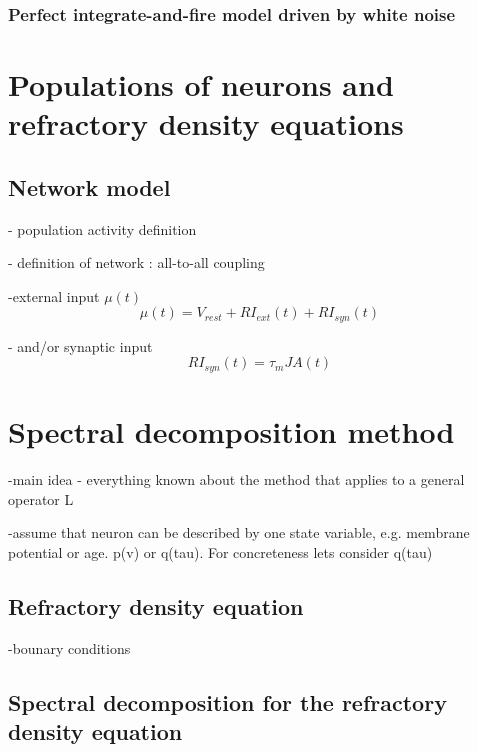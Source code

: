 \documentclass{report}
\begin{document}
\subsubsection{Perfect integrate-and-fire model driven by white noise}
\label{sec:pif}



\section{Populations of neurons and refractory density equations}


\subsection{Network model}


- population activity definition

- definition of network : all-to-all coupling

-external input $\mu(t)$
\begin{equation}
  \mu(t)=V_{rest}+RI_{ext}(t)+RI_{syn}(t)
\end{equation}

- and/or synaptic input
\begin{equation}
  \label{eq:input}
  RI_{syn}(t)=\tau_mJA(t)
\end{equation}


\section{Spectral decomposition method}

-main idea
- everything known about the method that applies to a general operator L 

-assume that neuron can be described by one state variable, e.g. membrane potential or age. p(v) or q(tau). For concreteness lets consider q(tau)

\subsection{Refractory density equation}

\cite{Ger00,ChiGra07}
-bounary conditions




\subsection{Spectral decomposition for the refractory density equation}
\end{document}
